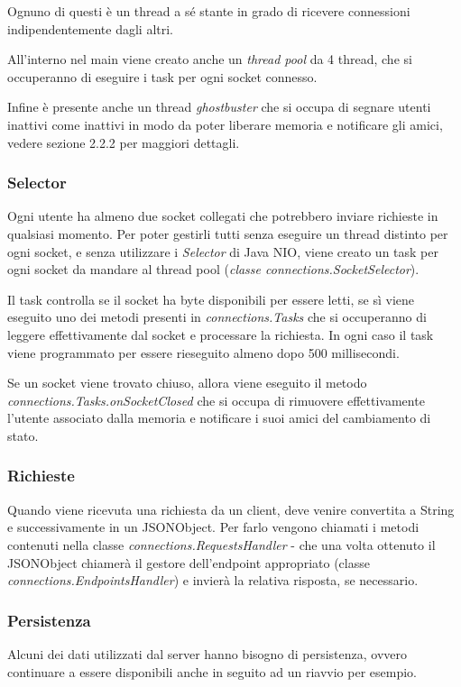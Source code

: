Ognuno di questi è un thread a sé stante in grado di ricevere connessioni indipendentemente dagli altri.

All'interno nel main viene creato anche un \textit{thread pool} da 4 thread, che si occuperanno di eseguire i task per ogni socket connesso.

Infine è presente anche un thread \textit{ghostbuster} che si occupa di segnare utenti inattivi come inattivi in modo da poter liberare memoria e notificare gli amici, vedere sezione 2.2.2 per maggiori dettagli.

\subsubsection{Selector}
Ogni utente ha almeno due socket collegati che potrebbero inviare richieste in qualsiasi momento. Per poter gestirli tutti senza eseguire un thread distinto per ogni socket, e senza utilizzare i \textit{Selector} di Java NIO, viene creato un task per ogni socket da mandare al thread pool (\textit{classe connections.SocketSelector}).

Il task controlla se il socket ha byte disponibili per essere letti, se sì viene eseguito uno dei metodi presenti in \textit{connections.Tasks} che si occuperanno di leggere effettivamente dal socket e processare la richiesta. In ogni caso il task viene programmato per essere rieseguito almeno dopo 500 millisecondi.

Se un socket viene trovato chiuso, allora viene eseguito il metodo \textit{connections.Tasks.onSocketClosed} che si occupa di rimuovere effettivamente l'utente associato dalla memoria e notificare i suoi amici del cambiamento di stato.

\subsubsection{Richieste}
Quando viene ricevuta una richiesta da un client, deve venire convertita a String e successivamente in un JSONObject. Per farlo vengono chiamati i metodi contenuti nella classe \textit{connections.RequestsHandler} - che una volta ottenuto il JSONObject chiamerà il gestore dell'endpoint appropriato (classe \textit{connections.EndpointsHandler}) e invierà la relativa risposta, se necessario.

\subsubsection{Persistenza}
Alcuni dei dati utilizzati dal server hanno bisogno di persistenza, ovvero continuare a essere disponibili anche in seguito ad un riavvio per esempio.

